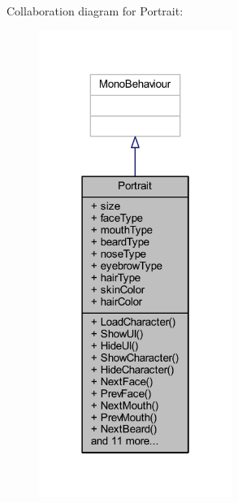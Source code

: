 Collaboration diagram for Portrait\+:\nopagebreak
\begin{figure}[H]
\begin{center}
\leavevmode
\includegraphics[width=178pt]{class_portrait__coll__graph}
\end{center}
\end{figure}
